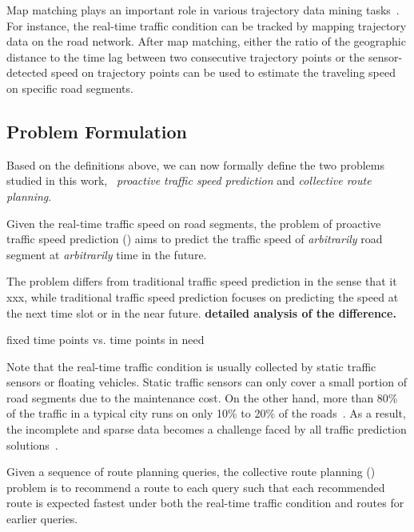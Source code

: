 Map matching plays an important role in various trajectory data mining tasks~\cite{Zheng2015TDM}. For instance, the real-time traffic condition can be tracked by mapping trajectory data on the road network. After map matching, either the ratio of the geographic distance to the time lag between two consecutive trajectory points or the sensor-detected speed on trajectory points can be used to estimate the traveling speed on specific road segments.


\subsection{Problem Formulation}
\label{subsec-problem}

Based on the definitions above, we can now formally define the two problems studied in this work,  \ie~{\em proactive traffic speed prediction} and {\em collective route planning}.

\begin{definition}Given the real-time traffic speed on road segments, the problem of proactive traffic speed prediction (\ptsp) aims to predict the traffic speed of {\em arbitrarily} road segment at {\em arbitrarily} time in the future. %
\end{definition}

The \ptsp problem differs from traditional traffic speed prediction in the sense that it xxx, while traditional traffic speed prediction focuses on predicting the speed at the next time slot or in the near future. {\bf detailed analysis of the difference.}

fixed time points vs. time points in need

Note that the real-time traffic condition is usually collected by static traffic sensors or floating vehicles. Static traffic sensors can only cover a small portion of road segments due to the maintenance cost. On the other hand, more than 80\% of the traffic in a typical city runs on only 10\% to 20\% of the roads~\cite{WuMSZZCWKDD16}. As a result, the incomplete and sparse data becomes a challenge faced by all traffic prediction solutions~\cite{Zhu2013TMC,Shang2014KDD,Lu2017Speed}.


\begin{definition} Given a sequence of route planning queries, the collective route planning (\crp) problem is to recommend a route to each query such that each recommended route is expected fastest under both the real-time traffic condition and routes for earlier queries.
\end{definition}
